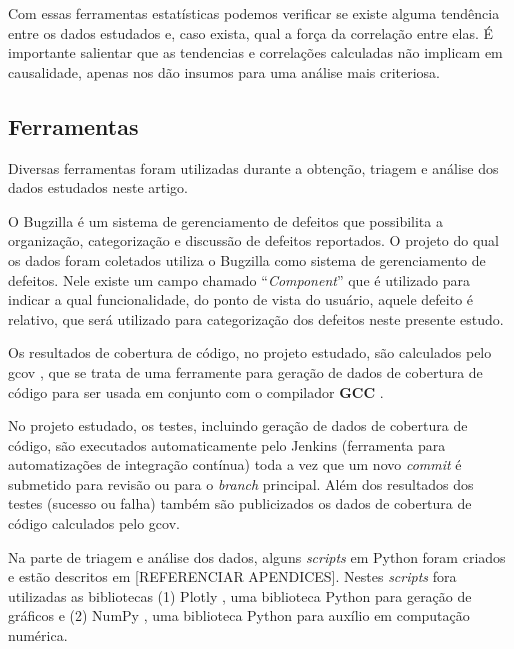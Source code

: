 \documentclass[11.5pt]{article}
\begin{document}
Com essas ferramentas estatísticas podemos verificar se existe alguma tendência entre os dados
estudados e, caso exista, qual a força da correlação entre elas.
É importante salientar que as tendencias e correlações calculadas não implicam em causalidade,
apenas nos dão insumos para uma análise mais criteriosa.


\subsection{Ferramentas}

Diversas ferramentas foram utilizadas durante a obtenção, triagem e análise dos dados estudados
neste artigo.

O Bugzilla \cite{bugzilla} é um sistema de gerenciamento de defeitos que possibilita a organização,
categorização e discussão de defeitos reportados.
O projeto do qual os dados foram coletados utiliza o Bugzilla como sistema de gerenciamento de
defeitos. Nele existe um campo chamado ``\textit{Component}'' que é utilizado para indicar a qual
funcionalidade, do ponto de vista do usuário, aquele defeito é relativo, que será utilizado para
categorização dos defeitos neste presente estudo.

Os resultados de cobertura de código, no projeto estudado, são calculados pelo gcov \cite{gcov}, que
se trata de uma ferramente para geração de dados de cobertura de código para ser usada em conjunto
com o compilador \textbf{GCC} \cite{gcc}.

No projeto estudado, os testes, incluindo geração de dados de cobertura de código, são executados
automaticamente pelo Jenkins \cite{jenkins} (ferramenta para automatizações de integração contínua)
toda a vez que um novo \textit{commit} é submetido para revisão ou para o \textit{branch} principal.
Além dos resultados dos testes (sucesso ou falha) também são publicizados os dados de cobertura de
código calculados pelo gcov.

Na parte de triagem e análise dos dados, alguns \textit{scripts} em Python foram criados e estão
descritos em [REFERENCIAR APENDICES]. Nestes \textit{scripts} fora utilizadas as bibliotecas
(1) Plotly \cite{plotly}, uma biblioteca Python para geração de gráficos e (2) NumPy \cite{numpy},
uma biblioteca Python para auxílio em computação numérica.


\end{document}
